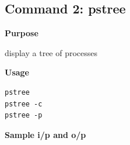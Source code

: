 \documentclass{article}
\begin{document}
\subsection{Command 2: pstree} 
\textbf{Purpose}
\begin{flushleft}
display a tree of processes
\end{flushleft}
\textbf{Usage}
\begin{verbatim}
pstree
pstree -c
pstree -p
\end{verbatim}
\textbf{Sample i/p and o/p}
\begin{figure}[H] 
\end{figure}
\end{document}
